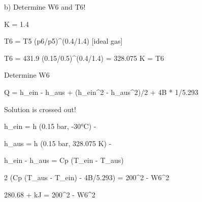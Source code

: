 b) Determine W6 and T6!

K = 1.4

T6 = T5 (p6/p5)^(0.4/1.4) [ideal gas]

T6 = 431.9 (0.15/0.5)^(0.4/1.4) = 328.075 K = T6

Determine W6

Q = h_ein - h_aus + (h_ein^2 - h_aus^2)/2 + 4B * 1/5.293

Solution is crossed out!

h_ein = h (0.15 bar, -30°C) -

h_aus = h (0.15 bar, 328.075 K) -

h_ein - h_aus = Cp (T_ein - T_aus)

2 (Cp (T_aus - T_ein) - 4B/5.293) = 200^2 - W6^2

280.68 + kJ = 200^2 - W6^2